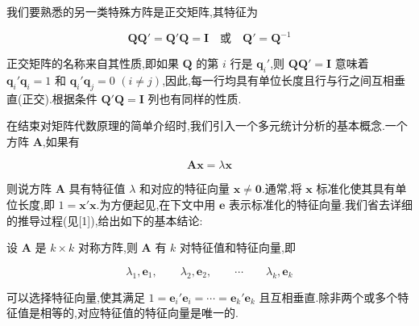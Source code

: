 我们要熟悉的另一类特殊方阵是正交矩阵,其特征为

\label{eq:2-13}
\begin{equation}
\bm{Q}\bm{Q}' = \bm{Q}'\bm{Q} = \bm{I} \quad \text{或} \quad \bm{Q}' = \bm{Q}^{-1} \tag{2-13}
\end{equation}

正交矩阵的名称来自其性质,即如果 $\bm{Q}$ 的第 $i$ 行是 $\bm{q}_i'$,则 $\bm{Q}\bm{Q}' = \bm{I}$ 意味着 $\bm{q}_i'\bm{q}_i = 1$ 和 $\bm{q}_i'\bm{q}_j = 0$ $(i \neq j)$,因此,每一行均具有单位长度且行与行之间互相垂直(正交).根据条件 $\bm{Q}'\bm{Q} = \bm{I}$ 列也有同样的性质.

在结束对矩阵代数原理的简单介绍时,我们引入一个多元统计分析的基本概念.一个方阵 $\bm{A}$,如果有

\label{eq:2-14}
\begin{equation}
\bm{A}\bm{x} = \lambda\bm{x} \tag{2-14}
\end{equation}

则说方阵 $\bm{A}$ 具有特征值 $\lambda$ 和对应的特征向量 $\bm{x} \neq \bm{0}$.通常,将 $\bm{x}$ 标准化使其具有单位长度,即 $1 = \bm{x}'\bm{x}$.为方便起见,在下文中用 $\bm{e}$ 表示标准化的特征向量.我们省去详细的推导过程(见[1]),给出如下的基本结论:

\begin{mvbox}
设 $\bm{A}$ 是 $k \times k$ 对称方阵,则 $\bm{A}$ 有 $k$ 对特征值和特征向量,即

\label{eq:2-15}
\begin{equation}
\lambda_1, \bm{e}_1, \qquad \lambda_2, \bm{e}_2, \qquad \cdots \qquad \lambda_k, \bm{e}_k \tag{2-15}
\end{equation}

可以选择特征向量,使其满足 $1 = \bm{e}_i'\bm{e}_i = \cdots = \bm{e}_k'\bm{e}_k$ 且互相垂直.除非两个或多个特征值是相等的,对应特征值的特征向量是唯一的.
\end{mvbox}
